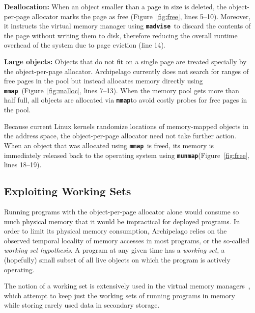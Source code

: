 \documentclass{acm_proc_article-sp}
\newcommand{\cfunction}[1]{{\bf \tt #1}}
\newcommand{\madvise}{\cfunction{madvise}}
\newcommand{\mmap}{\cfunction{mmap}}
\newcommand{\munmap}{\cfunction{munmap}}
\begin{document}
{\bf Deallocation:} When an object smaller than a page in size is
deleted, the object-per-page allocator marks the page as
free (Figure~\ref{fig:free}, lines 5--10). Moreover, it instructs the virtual memory manager using
\madvise\ to discard the contents of the page without writing them to
disk, therefore reducing the overall runtime overhead of the system
due to page eviction (line 14).

{\bf Large objects:} Objects that do not fit on a single page are
treated specially by the object-per-page allocator. Archipelago
currently does not search for ranges of free pages in the pool but
instead allocates memory directly using \mmap\
(Figure~\ref{fig:malloc}, lines 7--13). When the memory pool gets more
than half full, all objects are allocated via \mmap to avoid costly
probes for free pages in the pool.

Because current Linux kernels randomize locations of memory-mapped
objects in the address space, the object-per-page allocator need not
take further action. When an object that was allocated using
\mmap\ is freed, its memory is immediately released back to the
operating system using \munmap (Figure~\ref{fig:free}, lines 18--19).


\subsection{Exploiting Working Sets}
\label{sec:compaction}

\noindent
Running programs with the object-per-page allocator alone would
consume so much physical memory that it would be impractical for
deployed programs. In order to limit its physical memory consumption,
Archipelago relies on the observed temporal locality of memory
accesses in most programs, or the so-called \emph{working set
hypothesis}. A program at any given time has a
\emph{working set}, a (hopefully) small subset of all live objects on
which the program is actively operating.

The notion of a working set is extensively used in the virtual memory
managers~\cite{denn68}, which attempt to keep just the working sets of
running programs in memory while storing rarely used data in secondary
storage.
\end{document}
